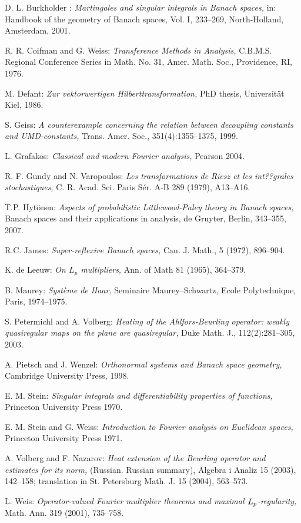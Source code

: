\documentclass[11pt,a4paper,twoside,draft]{amsart}
\theoremstyle{definition}
\begin{document}
\begin{thebibliography}{1}
D. L. Burkholder : { \it  Martingales and singular integrals in Banach spaces,} in: 
Handbook of the geometry of Banach spaces, Vol. I,  233--269, North-Holland, Amsterdam, 2001.

 R. R. Coifman and G. Weiss: 
{\it Transference Methods in Analysis,}
C.B.M.S. Regional Conference Series in Math. No. 31, Amer. Math. Soc., Providence, RI, 1976.

M. Defant:
{\em Zur vektorwertigen Hilberttransformation,}
PhD thesis, Universit\"at Kiel, 1986.

S. Geiss:
{\it A counterexample concerning the relation between decoupling constants
and UMD-constants,}
Trans. Amer. Soc., 351(4):1355--1375, 1999.

 L. Grafakos: {\it  Classical and modern Fourier analysis,} 
Pearson 2004.

R. F. Gundy and N. Varopoulos: {\it Les transformations de Riesz et les int??grales 
stochastiques,}
C. R. Acad. Sci. Paris S\'er. A-B  289  (1979), A13--A16.

T.P. Hyt\"onen: {\it Aspects of probabilistic Littlewood-Paley theory
in Banach spaces,} 
Banach spaces and their applications in analysis,  de Gruyter, Berlin,
343--355, 2007. 

R.C. James: {\it Super-reflexive Banach spaces,}
Can. J. Math., 5 (1972), 896--904. 

 K. de Leeuw: 
{\it On $L_p$ multipliers,} Ann. of Math 81 (1965), 364--379.

B. Maurey: 
{\it Syst\`{e}me de {H}aar,} Seminaire Maurey--Schwartz, Ecole Polytechnique, Paris, 1974--1975.

S. Petermichl and A. Volberg:
{\it Heating of the Ahlfors-Beurling operator: weakly quasiregular maps on
    the plane are quasiregular,}
Duke Math. J., 112(2):281--305, 2003.

A. Pietsch and J. Wenzel:
{\it Orthonormal systems and {B}anach space geometry,}
Cambridge University Press, 1998.

E. M. Stein: {\it Singular integrals and differentiability properties of functions,} 
Princeton University Press 1970.

 E. M. Stein and G. Weiss: 
{\it  Introduction to Fourier analysis on Euclidean spaces,} 
Princeton University Press 1971.

A. Volberg and F. Nazarov: {\it Heat extension of the Beurling operator and estimates for 
its norm,} (Russian. Russian summary), Algebra i Analiz 15 (2003),  142--158; 
translation in St. Petersburg Math. J. 15 (2004),  563--573.

L. Weis: {\it Operator-valued Fourier multiplier theorems and maximal $L\sb p$-regularity,}  
Math. Ann.  319  (2001),  735--758.

\end{thebibliography}
\end{document}

